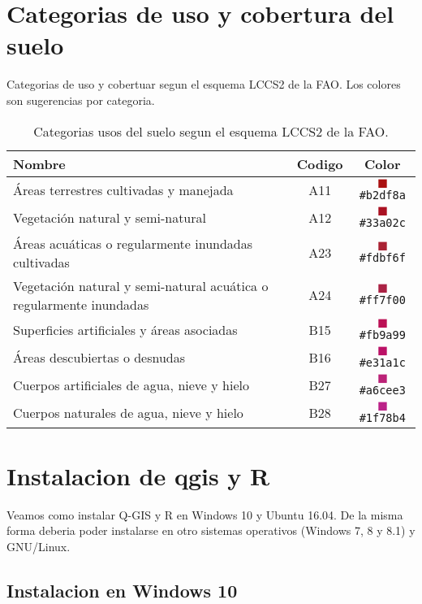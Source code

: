 \chapter{Categorias de uso y cobertura del suelo}\label{apcate}
Categorias de uso y cobertuar segun el esquema LCCS2 de la FAO\@. Los colores son
sugerencias por categoria.
\begin{table}[hbt]
    \centering
    \begin{tabular}{p{11cm}cc}
        \toprule
        Nombre & Codigo & Color \\
        \midrule
        Áreas terrestres cultivadas y manejada & A11 & \textcolor{A11}{$\blacksquare$}\texttt{\#b2df8a}
        \\
        Vegetación natural y semi-natural & A12 & \textcolor{A12}{$\blacksquare$}\texttt{\#33a02c}\\
        Áreas acuáticas o regularmente inundadas cultivadas & A23  &
        \textcolor{A23}{$\blacksquare$}\texttt{\#fdbf6f}\\
        Vegetación natural y semi-natural acuática o
	regularmente inundadas & A24 & \textcolor{A24}{$\blacksquare$}\texttt{\#ff7f00}\\
        Superficies artificiales y áreas asociadas & B15  &
        \textcolor{B15}{$\blacksquare$}\texttt{\#fb9a99}\\
        Áreas descubiertas o desnudas & B16 & \textcolor{B16}{$\blacksquare$}\texttt{\#e31a1c}\\
        Cuerpos artificiales de agua, nieve y hielo & B27 &
        \textcolor{B27}{$\blacksquare$}\texttt{\#a6cee3}\\
        Cuerpos naturales de agua, nieve y hielo & B28&
        \textcolor{B28}{$\blacksquare$}\texttt{\#1f78b4}\\
        \bottomrule
    \end{tabular}
\caption{\label{tabla1}Categorias usos del suelo segun el esquema LCCS2 de la
FAO.}
\end{table}

\chapter{Instalacion de qgis y R} \label{chap:instalacion}

Veamos como instalar Q-GIS y R en Windows 10 y Ubuntu 16.04. De la misma forma deberia poder instalarse en otro sistemas operativos (Windows 7, 8 y 8.1) y GNU/Linux.

\section{Instalacion en Windows 10}

